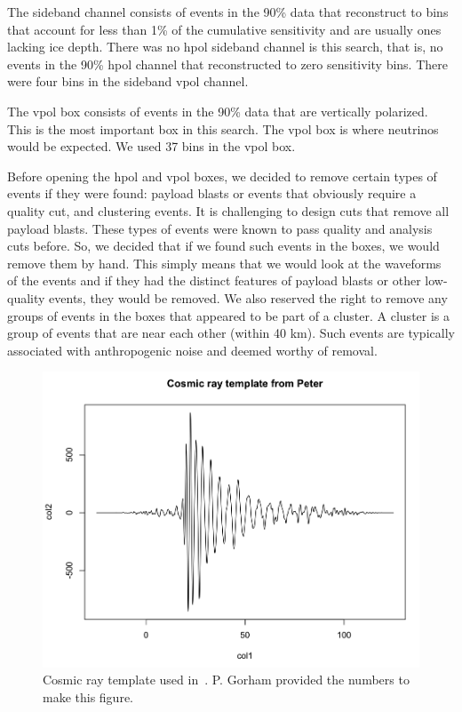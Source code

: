 The sideband channel consists of events in the 90\% data that reconstruct to bins that account for less than 1\% of the cumulative sensitivity and are usually ones lacking ice depth. There was no \gls{hpol} sideband channel is this search, that is, no events in the 90\% \gls{hpol} channel that reconstructed to zero sensitivity bins.  There were four bins in the sideband \gls{vpol} channel. 

The \gls{vpol} box consists of events in the 90\% data that are vertically polarized. This is the most important box in this search. The \gls{vpol} box is where neutrinos would be expected. We used 37 bins in the \gls{vpol} box. 

Before opening the \gls{hpol} and \gls{vpol} boxes, we decided to remove certain types of events if they were found: payload blasts or events that obviously require a quality cut, and clustering events. 
It is challenging to design cuts that remove all payload blasts.
These types of events were known to pass quality and analysis cuts before. So, we decided that if we found such events in the boxes, we would remove them by hand. This simply means that we would look at the waveforms of the events and if they had the distinct features of payload blasts or other low-quality events, they would be removed. We also reserved the right to remove any groups of events in the boxes that appeared to be part of a cluster. A cluster is a group of events that are near each other (within 40 km). Such events are typically associated with anthropogenic noise and deemed worthy of removal. 


\begin{figure}
\centering
\includegraphics[width=1.0\textwidth]{figures/CRtemplate.png}
\caption{Cosmic ray template used in~\cite{me2}. P. Gorham provided the numbers to make this figure.}
\label{cr_template}
\end{figure}


